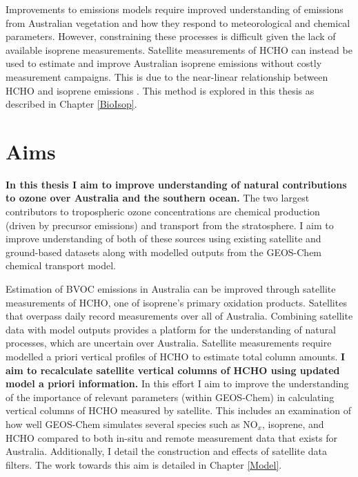     Improvements to emissions models require improved understanding of emissions from Australian vegetation and how they respond to meteorological and chemical parameters.
    However, constraining these processes is difficult given the lack of available isoprene measurements.
    Satellite measurements of HCHO can instead be used to estimate and improve Australian isoprene emissions without costly measurement campaigns.
    This is due to the near-linear relationship between HCHO and isoprene emissions \parencite[e.g.,][]{Palmer2001, Millet2006, Bauwens2016}.
    This method is explored in this thesis as described in Chapter \ref{BioIsop}.
  

  
\section{Aims}
\label{LR:Aims}

  \textbf{In this thesis I aim to improve understanding of natural contributions to ozone over Australia and the southern ocean.}
  The two largest contributors to tropospheric ozone concentrations are chemical production (driven by precursor emissions) and transport from the stratosphere.
  I aim to improve understanding of both of these sources using existing satellite and ground-based datasets along with modelled outputs from the GEOS-Chem chemical transport model.
  
  Estimation of BVOC emissions in Australia can be improved through satellite measurements of HCHO, one of isoprene's primary oxidation products.
  Satellites that overpass daily record %
  measurements over all of Australia.
  Combining satellite data with model outputs provides a platform for the understanding of natural processes, which are uncertain over Australia.
  Satellite measurements require modelled a priori vertical profiles of HCHO to estimate total column amounts.
  \textbf{I aim to recalculate satellite vertical columns of HCHO using updated model a priori information.}
  In this effort I aim to improve the understanding of the importance of relevant parameters (within GEOS-Chem) in calculating vertical columns of HCHO measured by satellite.
  This includes an examination of how well GEOS-Chem simulates several species such as NO$_x$, isoprene, and HCHO compared to both in-situ and remote measurement data that exists for Australia.
  Additionally, I detail the construction and effects of satellite data filters.
  The work towards this aim is detailed in Chapter \ref{Model}.
  
